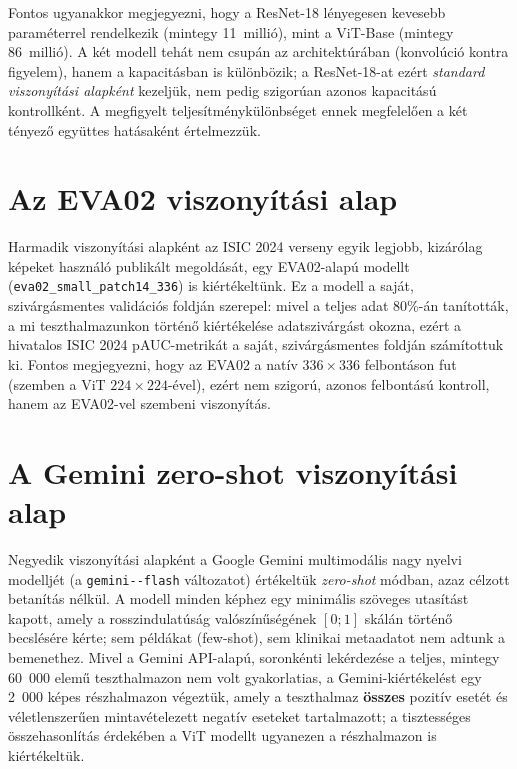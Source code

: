 Fontos ugyanakkor megjegyezni, hogy a ResNet-18 lényegesen kevesebb paraméterrel
rendelkezik (mintegy 11~millió), mint a ViT-Base (mintegy 86~millió). A két
modell tehát nem csupán az architektúrában (konvolúció kontra figyelem), hanem a
kapacitásban is különbözik; a ResNet-18-at ezért \emph{standard viszonyítási
alapként} kezeljük, nem pedig szigorúan azonos kapacitású kontrollként. A
megfigyelt teljesítménykülönbséget ennek megfelelően a két tényező együttes
hatásaként értelmezzük.

\section{Az EVA02 viszonyítási alap}

Harmadik viszonyítási alapként az ISIC 2024 verseny egyik legjobb, kizárólag
képeket használó publikált megoldását, egy EVA02-alapú modellt
(\texttt{eva02\_small\_patch14\_336}) is kiértékeltünk. Ez a modell a saját,
szivárgásmentes validációs foldján szerepel: mivel a teljes adat 80\%-án
tanították, a mi teszthalmazunkon történő kiértékelése adatszivárgást okozna,
ezért a hivatalos ISIC 2024 pAUC-metrikát a saját, szivárgásmentes foldján számítottuk
ki. Fontos megjegyezni, hogy az EVA02 a natív $336 \times 336$ felbontáson fut
(szemben a ViT $224 \times 224$-ével), ezért nem szigorú, azonos felbontású
kontroll, hanem az EVA02-vel szembeni viszonyítás.

\section{A Gemini zero-shot viszonyítási alap}

Negyedik viszonyítási alapként a Google Gemini multimodális nagy nyelvi modelljét
\cite{gemini2023}
(a \texttt{gemini--\allowbreak flash} változatot) értékeltük
\textit{zero-shot} módban, azaz célzott betanítás nélkül. A modell minden képhez
egy minimális szöveges utasítást kapott, amely a rosszindulatúság
valószínűségének $[0;1]$ skálán történő becslésére kérte; sem példákat
(few-shot), sem klinikai metaadatot nem adtunk a bemenethez. Mivel a Gemini
API-alapú, soronkénti lekérdezése a teljes, mintegy 60~000 elemű teszthalmazon
nem volt gyakorlatias, a Gemini-kiértékelést egy 2~000 képes részhalmazon
végeztük, amely a teszthalmaz \textbf{összes} pozitív esetét és véletlenszerűen
mintavételezett negatív eseteket tartalmazott; a tisztességes összehasonlítás
érdekében a ViT modellt ugyanezen a részhalmazon is kiértékeltük.

